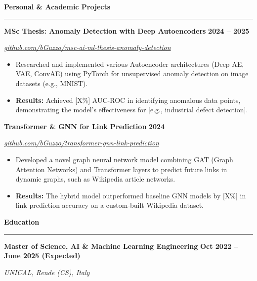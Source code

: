 \documentclass[9pt, a4paper]{article}
\newcommand{\cvsection}[1]{%
  \vspace{8pt} %
  \par %
  {\Large\bfseries\color{sectionblue}#1} %
  \par %
  \vspace{2pt} %
  \hrule %
  \vspace{6pt} %
}
\newcommand{\cvsubsection}[3]{%
  \par %
  {\large\bfseries #1} %
  \hfill %
  {\bfseries #2} %
  \par %
  {\textit{#3}} %
  \vspace{4pt} %
}
\begin{document}
\begin{minipage}[t]{0.70\textwidth}
\cvsection{Personal \& Academic Projects}

\cvsubsection
  {MSc Thesis: Anomaly Detection with Deep Autoencoders} %
  {2024 -- 2025} %
  {\href{https://github.com/bGuzzo/msc-ai-ml-thesis-anomaly-detection}{github.com/bGuzzo/msc-ai-ml-thesis-anomaly-detection}} %

\begin{itemize}[leftmargin=*, nosep]
    \item Researched and implemented various Autoencoder architectures (Deep AE, VAE, ConvAE) using PyTorch for unsupervised anomaly detection on image datasets (e.g., MNIST).
    \item \textbf{Results:} Achieved [X\%] AUC-ROC in identifying anomalous data points, demonstrating the model's effectiveness for [e.g., industrial defect detection].
\end{itemize}

\vspace{6pt} %
\cvsubsection
  {Transformer \& GNN for Link Prediction} %
  {2024} %
  {\href{https://github.com/bGuzzo/transformer-gnn-link-prediction}{github.com/bGuzzo/transformer-gnn-link-prediction}} %

\begin{itemize}[leftmargin=*, nosep]
    \item Developed a novel graph neural network model combining GAT (Graph Attention Networks) and Transformer layers to predict future links in dynamic graphs, such as Wikipedia article networks.
    \item \textbf{Results:} The hybrid model outperformed baseline GNN models by [X\%] in link prediction accuracy on a custom-built Wikipedia dataset.
\end{itemize}


\cvsection{Education}

\cvsubsection
  {Master of Science, AI \& Machine Learning Engineering} %
  {Oct 2022 -- June 2025 (Expected)} %
  {UNICAL, Rende (CS), Italy} %



\end{minipage}
\end{document}
